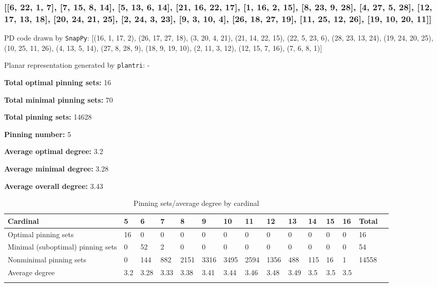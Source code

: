 \documentclass{article}%
\begin{document}
\newpage

\subsubsection{[[6, 22, 1, 7], [7, 15, 8, 14], [5, 13, 6, 14], [21, 16, 22, 17], [1, 16, 2, 15], [8, 23, 9, 28], [4, 27, 5, 28], [12, 17, 13, 18], [20, 24, 21, 25], [2, 24, 3, 23], [9, 3, 10, 4], [26, 18, 27, 19], [11, 25, 12, 26], [19, 10, 20, 11]]}

{\small\noindent PD code drawn by \texttt{SnapPy}: [(16, 1, 17, 2), (26, 17, 27, 18), (3, 20, 4, 21), (21, 14, 22, 15), (22, 5, 23, 6), (28, 23, 13, 24), (19, 24, 20, 25), (10, 25, 11, 26), (4, 13, 5, 14), (27, 8, 28, 9), (18, 9, 19, 10), (2, 11, 3, 12), (12, 15, 7, 16), (7, 6, 8, 1)]}

{\small\noindent Planar representation generated by \texttt{plantri}: -}

\begin{multicols}{2}
{\normalsize \noindent\textbf{Total optimal pinning sets:} 16

\noindent\textbf{Total minimal pinning sets:} 70

\noindent\textbf{Total pinning sets:} 14628

\noindent\textbf{Pinning number:} 5

}
\columnbreak

{\normalsize \noindent\textbf{Average optimal degree:} 3.2

\noindent\textbf{Average minimal degree:} 3.28

\noindent\textbf{Average overall degree:} 3.43

}
\end{multicols}

\begin{table}[ht]
	\caption{Pinning sets/average degree by cardinal}
	\centering
	\renewcommand{\arraystretch}{1.5}
	\begin{tabularx}{\textwidth}{lXXXXXXXXXXXXXX}
		\toprule
			Cardinal & 5 & 6 & 7 & 8 & 9 & 10 & 11 & 12 & 13 & 14 & 15 & 16 & Total\\
			\hline
			Optimal pinning sets & 16 & 0 & 0 & 0 & 0 & 0 & 0 & 0 & 0 & 0 & 0 & 0 & 16 \\
			Minimal (suboptimal) pinning sets & 0 & 52 & 2 & 0 & 0 & 0 & 0 & 0 & 0 & 0 & 0 & 0 & 54 \\
			Nonminimal pinning sets & 0 & 144 & 882 & 2151 & 3316 & 3495 & 2594 & 1356 & 488 & 115 & 16 & 1 & 14558 \\
			Average degree & 3.2 & 3.28 & 3.33 & 3.38 & 3.41 & 3.44 & 3.46 & 3.48 & 3.49 & 3.5 & 3.5 & 3.5 &  \\
		\bottomrule \\ 
	\end{tabularx}
\end{table}
\end{document}
